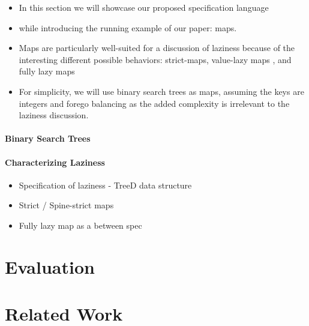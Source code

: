 \documentclass[acmsmall,review]{acmart}\settopmatter{}
\begin{document}

\begin{itemize}
\item In this section we will showcase our proposed specification language 
\item while introducing the running example of our paper: maps.
\item Maps are particularly well-suited for a discussion of laziness because of the interesting different
possible behaviors: strict-maps, value-lazy maps , and fully lazy maps
\item For simplicity, we will use binary search trees as maps, assuming the keys are integers and forego balancing
as the added complexity is irrelevant to the laziness discussion. 
\end{itemize}

\paragraph*{Binary Search Trees}


\paragraph*{Characterizing Laziness}

\begin{itemize}
\item Specification of laziness - TreeD data structure 
\item Strict / Spine-strict maps
\item Fully lazy map as a between spec
\end{itemize}

\section{Evaluation}
\label{sec:eval}

\section{Related Work}
\label{sec:related}

\end{document}
